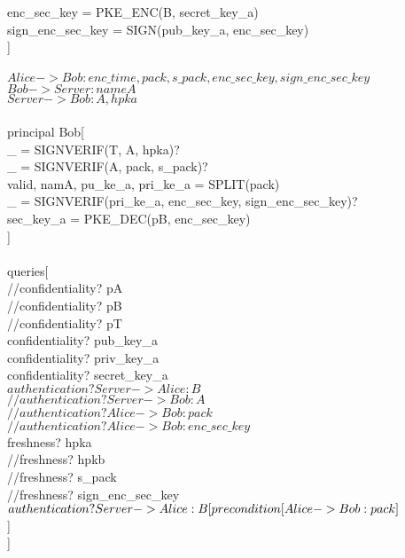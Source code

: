 \documentclass[11pt]{article}
\begin{document}
	enc\_sec\_key = PKE\_ENC(B, secret\_key\_a)\\
	sign\_enc\_sec\_key = SIGN(pub\_key\_a, enc\_sec\_key)\\
 ]\\\\
$Alice -> Bob: enc\_time, pack, s\_pack, enc\_sec\_key, sign\_enc\_sec\_key$\\
 $Bob -> Server: nameA$\\
 $Server -> Bob: A, hpka$\\\\
 principal Bob[\\
	\_ = SIGNVERIF(T, A, hpka)?\\
	\_ = SIGNVERIF(A, pack, s\_pack)?\\
	valid, namA, pu\_ke\_a, pri\_ke\_a = SPLIT(pack)\\
	\_ = SIGNVERIF(pri\_ke\_a, enc\_sec\_key, sign\_enc\_sec\_key)?\\
	sec\_key\_a = PKE\_DEC(pB, enc\_sec\_key)\\
 ]\\\\
 queries[\\
 	//confidentiality? pA\\
	//confidentiality? pB\\	
	//confidentiality? pT\\
	confidentiality? pub\_key\_a\\
	confidentiality? priv\_key\_a\\
	confidentiality? secret\_key\_a\\
	$authentication? Server -> Alice: B$\\
	$//authentication? Server -> Bob: A$\\
	$//authentication? Alice -> Bob: pack$\\
	$//authentication? Alice -> Bob: enc\_sec\_key$\\
	freshness? hpka\\
	//freshness? hpkb\\
	//freshness? s\_pack\\
	//freshness? sign\_enc\_sec\_key\\
	$authentication? Server -> Alice: B[\\
	precondition[Alice -> Bob: pack]$\\
	]\\
 ]\\\\
 
\end{document}
